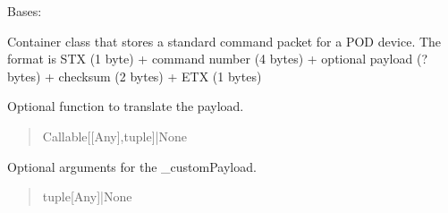 \documentclass[letterpaper,10pt,english]{sphinxmanual}
\begin{document}
\begin{fulllineitems}
\label{\detokenize{Morelia.Packets:Morelia.Packets.Standard.PacketStandard}}
\pysigstartsignatures
{}
\pysigstopsignatures
\sphinxAtStartPar
Bases: {\hyperref[\detokenize{Morelia.Packets:Morelia.Packets.Packet.Packet}]{}}

\sphinxAtStartPar
Container class that stores a standard command packet for a POD device. The format is     STX (1 byte) + command number (4 bytes) + optional payload (? bytes) + checksum (2 bytes) + ETX (1 bytes)

\begin{fulllineitems}
\label{\detokenize{Morelia.Packets:Morelia.Packets.Standard.PacketStandard._customPayload}}
\pysigstartsignatures
{}
\pysigstopsignatures
\sphinxAtStartPar
Optional function to translate the payload.
\begin{quote}\begin{description}
\sphinxAtStartPar
Callable{[}{[}Any{]},tuple{]}|None

\end{description}\end{quote}

\end{fulllineitems}


\begin{fulllineitems}
\label{\detokenize{Morelia.Packets:Morelia.Packets.Standard.PacketStandard._customPayloadArgs}}
\pysigstartsignatures
{}
\pysigstopsignatures
\sphinxAtStartPar
Optional arguments for the \_customPayload.
\begin{quote}\begin{description}
\sphinxAtStartPar
tuple{[}Any{]}|None


\end{description}
\end{quote}
\end{fulllineitems}
\end{fulllineitems}
\end{document}
